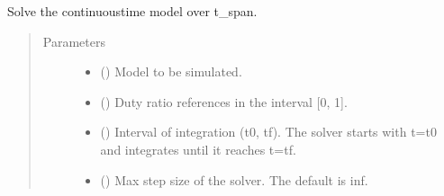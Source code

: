 \documentclass[letterpaper,10pt,english]{sphinxmanual}
\begin{document}
\begin{fulllineitems}
\label{\detokenize{model:model.interfaces.solve}}
\pysigstartsignatures
{}
\pysigstopsignatures
\sphinxAtStartPar
Solve the continuous\sphinxhyphen{}time model over t\_span.
\begin{quote}\begin{description}
\item[{Parameters}] \leavevmode\begin{itemize}
\item {} 
\sphinxAtStartPar
{} () \textendash{} Model to be simulated.

\item {} 
\sphinxAtStartPar
{} (\sphinxstyleliteralemphasis{\sphinxupquote{, }}\sphinxstyleliteralemphasis{\sphinxupquote{ (}}\sphinxstyleliteralemphasis{\sphinxupquote{,}}\sphinxstyleliteralemphasis{\sphinxupquote{)}}) \textendash{} Duty ratio references in the interval {[}0, 1{]}.

\item {} 
\sphinxAtStartPar
{} () \textendash{} Interval of integration (t0, tf). The solver starts with t=t0 and
integrates until it reaches t=tf.

\item {} 
\sphinxAtStartPar
{} (\sphinxstyleliteralemphasis{\sphinxupquote{, }}) \textendash{} Max step size of the solver. The default is inf.

\end{itemize}

\end{description}\end{quote}

\end{fulllineitems}
\end{document}
